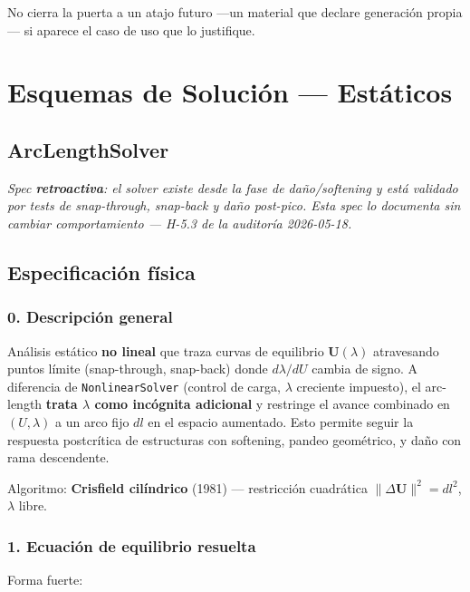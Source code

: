 \documentclass[11pt,letterpaper,oneside]{report}
\begin{document}
   No cierra la puerta a un atajo futuro ---un material que declare generación propia--- si aparece el caso de uso que lo justifique.


\newpage

\chapter{Esquemas de Solución — Estáticos}

\section{ArcLengthSolver}



\textit{Spec \textbf{retroactiva}: el solver existe desde la fase de daño/softening y está validado por tests de snap-through, snap-back y daño post-pico. Esta spec lo documenta sin cambiar comportamiento --- H-5.3 de la auditoría 2026-05-18.}



\section{Especificación física}

\subsection{0. Descripción general}

Análisis estático \textbf{no lineal} que traza curvas de equilibrio $\mathbf U(\lambda)$ atravesando puntos límite (snap-through, snap-back) donde $d\lambda/dU$ cambia de signo. A diferencia de \texttt{NonlinearSolver} (control de carga, $\lambda$ creciente impuesto), el arc-length \textbf{trata $\lambda$ como incógnita adicional} y restringe el avance combinado en $(U, \lambda)$ a un arco fijo $dl$ en el espacio aumentado. Esto permite seguir la respuesta postcrítica de estructuras con softening, pandeo geométrico, y daño con rama descendente.

Algoritmo: \textbf{Crisfield cilíndrico} (1981) --- restricción cuadrática $\lVert\Delta\mathbf U\rVert^2 = dl^2$, $\lambda$ libre.

\subsection{1. Ecuación de equilibrio resuelta}

Forma fuerte:
\end{document}
